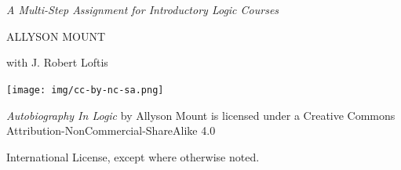 \documentclass[oneside, openany]{book} %
\begin{document}
\setlength{\parindent}{1em}
\setlength{\parskip}{1em}	

\titlepage
\vfill

\\ \vspace{6pt}\\
\noindent\textit{A Multi-Step Assignment for Introductory Logic Courses}

\vfill
\noindent ALLYSON MOUNT 

\noindent with J. Robert Loftis
\vfill

\frontmatter


\noindent \texttt{[image: img/cc-by-nc-sa.png]}\\ \vspace{6pt}

\noindent \textit{Autobiography In Logic} by Allyson Mount is licensed under a Creative Commons Attribution-NonCommercial-ShareAlike 4.0 \\ \vspace{6pt}

\noindent International License, except where otherwise noted.



\tableofcontents
\end{document}
